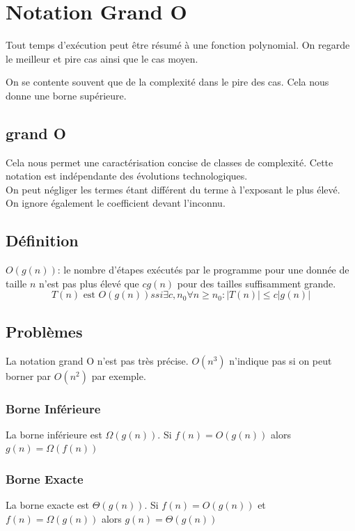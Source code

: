\documentclass{report}
\begin{document}
\section{Notation Grand O}
Tout temps d'exécution peut être résumé à une fonction polynomial. On regarde le meilleur et pire cas ainsi que le cas moyen.\par
On se contente souvent que de la complexité dans le pire des cas. Cela nous donne une borne supérieure.
\subsection{grand O}
Cela nous permet une caractérisation concise de classes de complexité. Cette notation est indépendante des évolutions technologiques.\\
On peut négliger les termes étant différent du terme à l'exposant le plus élevé. On ignore également le coefficient devant l'inconnu.

\subsection{Définition}
$O(g(n))$: le nombre d'étapes exécutés par le programme pour une donnée de taille $n$ n'est pas plus élevé que $cg(n)$ pour des tailles suffisamment grande.
\begin{equation}
T(n) \text{ est } O(g(n)) ssi \exists c,n_0 \forall n \geqslant n_0 : |T(n)| \leqslant c |g(n)|
\end{equation}

\subsection{Problèmes}
La notation grand O n'est pas très précise. $O(n^3)$ n'indique pas si on peut borner par $O(n^2)$ par exemple.

\subsubsection{Borne Inférieure}
La borne inférieure est $\Omega(g(n))$. Si $f(n) = O(g(n))$ alors $g(n) = \Omega(f(n))$

\subsubsection{Borne Exacte}
La borne exacte est $\Theta(g(n))$. Si $f(n) = O(g(n))$ et $f(n) = \Omega(g(n))$ alors $g(n) = \Theta(g(n))$
\end{document}
